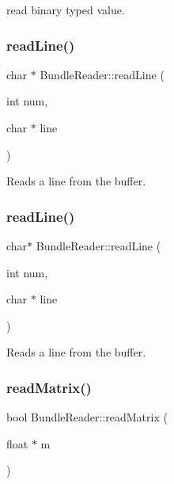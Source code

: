 read binary typed value. \mbox{\label{classBundleReader_a06471b594aaeec7cdfe8f5f1fdebcc37}} 
\subsubsection{\texorpdfstring{read\+Line()}{readLine()}\hspace{0.1cm}{\footnotesize\ttfamily [1/2]}}
{\footnotesize\ttfamily char $\ast$ Bundle\+Reader\+::read\+Line (\begin{DoxyParamCaption}\item[{int}]{num,  }\item[{char $\ast$}]{line }\end{DoxyParamCaption})}

Reads a line from the buffer. \mbox{\label{classBundleReader_abc32008d82d452279dfb186c6b3384fe}} 
\subsubsection{\texorpdfstring{read\+Line()}{readLine()}\hspace{0.1cm}{\footnotesize\ttfamily [2/2]}}
{\footnotesize\ttfamily char$\ast$ Bundle\+Reader\+::read\+Line (\begin{DoxyParamCaption}\item[{int}]{num,  }\item[{char $\ast$}]{line }\end{DoxyParamCaption})}

Reads a line from the buffer. \mbox{\label{classBundleReader_a50ad5f05a615c668967da07e1345d931}} 
\subsubsection{\texorpdfstring{read\+Matrix()}{readMatrix()}\hspace{0.1cm}{\footnotesize\ttfamily [1/2]}}
{\footnotesize\ttfamily bool Bundle\+Reader\+::read\+Matrix (\begin{DoxyParamCaption}\item[{float $\ast$}]{m }\end{DoxyParamCaption})}

